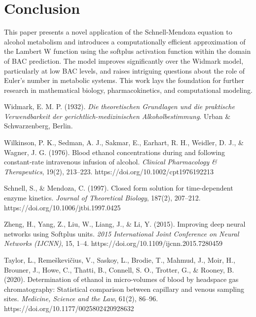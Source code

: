 \documentclass[12pt]{article}
\begin{document}
\section{Conclusion}
This paper presents a novel application of the Schnell-Mendoza equation to alcohol metabolism and introduces a computationally efficient approximation of the Lambert W function using the softplus activation function within the domain of BAC prediction. The model improves significantly over the Widmark model, particularly at low BAC levels, and raises intriguing questions about the role of Euler's number in metabolic systems. This work lays the foundation for further research in mathematical biology, pharmacokinetics, and computational modeling.

\pagebreak




\begin{thebibliography}{9}

Widmark, E. M. P. (1932). 
\textit{Die theoretischen Grundlagen und die praktische Verwendbarkeit der gerichtlich-medizinischen Alkoholbestimmung}. 
Urban \& Schwarzenberg, Berlin.

Wilkinson, P. K., Sedman, A. J., Sakmar, E., Earhart, R. H., Weidler, D. J., \& Wagner, J. G. (1976). Blood ethanol concentrations during and following constant‐rate intravenous infusion of alcohol. \textit{Clinical Pharmacology \& Therapeutics}, 19(2), 213–223. https://doi.org/10.1002/cpt1976192213

Schnell, S., \& Mendoza, C. (1997). Closed form solution for time-dependent enzyme kinetics. \textit{Journal of Theoretical Biology}, 187(2), 207–212. https://doi.org/10.1006/jtbi.1997.0425 

Zheng, H., Yang, Z., Liu, W., Liang, J., \& Li, Y. (2015). Improving deep neural networks using Softplus units. \textit{2015 International Joint Conference on Neural Networks (IJCNN)}, 15, 1–4. https://doi.org/10.1109/ijcnn.2015.7280459 

Taylor, L., Remeškevičius, V., Saskoy, L., Brodie, T., Mahmud, J., Moir, H., Brouner, J., Howe, C., Thatti, B., Connell, S. O., Trotter, G., \& Rooney, B. (2020). Determination of ethanol in micro-volumes of blood by headspace gas chromatography: Statistical comparison between capillary and venous sampling sites. \textit{Medicine, Science and the Law}, 61(2), 86–96. https://doi.org/10.1177/0025802420928632 

\end{thebibliography}
\end{document}
